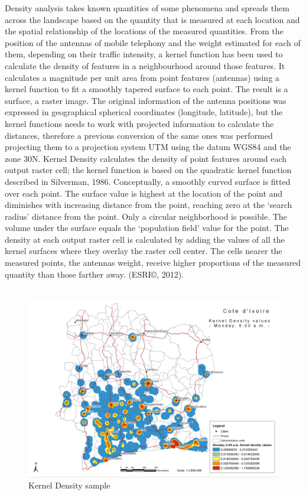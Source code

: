 \newpage
Density analysis takes known quantities of some phenomena and spreads them across the landscape based on the quantity that is measured at each location and the spatial relationship of the locations of the measured quantities. From the position of the antennas of mobile telephony and the weight estimated for each of them, depending on their traffic intensity, a kernel function has been used to calculate the density of features in a neighbourhood around those features. It calculates a magnitude per unit area from point features (antennas) using a kernel function to fit a smoothly tapered surface to each point. The result is a surface, a raster image. The original information of the antenna positions was expressed in geographical spherical coordinates (longitude, latitude), but the kernel functions needs to work with  projected information to calculate the distances, therefore a previous conversion of the same ones was performed projecting them to a projection system UTM using the datum WGS84 and the zone 30N. Kernel Density calculates the density of point features around each output raster cell; the kernel function is based on the quadratic kernel function described in Silverman, 1986. Conceptually, a smoothly curved surface is fitted over each point. The surface value is highest at the location of the point and diminishes with increasing distance from the point, reaching zero at the ‘search radius’ distance from the point. Only a circular neighborhood is possible. The volume under the surface equals the ‘population field’ value for the point. The density at each output raster cell is calculated by adding the values of all the kernel surfaces where they overlay the raster cell center. The cells nearer the measured points, the antennas weight, receive higher proportions of the measured quantity than those farther away. (ESRI©, 2012).
\\
\\
\begin{figure}[h]
\begin{center}
\includegraphics[scale = 0.43] {results/images/kernel/L_hour6_kd_Map.pdf}
\caption{Kernel Density sample}
\label{fig:ks_sample}
\end{center}
\end{figure}


